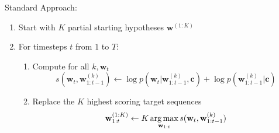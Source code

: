 \documentclass{beamer}
\let\tempone\itemize
\let\temptwo\enditemize
\renewenvironment{itemize}{\tempone\addtolength{\itemsep}{0.5\baselineskip}}{\temptwo}
\newcommand{\air}{\vspace{0.25cm}}
\newcommand{\wvec}{\mathbf{w}}
\newcommand{\cvec}{\mathbf{c}}
\def\argmax{\operatornamewithlimits{arg\,max}}
\def\argmax{\operatornamewithlimits{arg\,max}}
\begin{document}
\begin{frame}
  \centerline{Standard Approach: }
  \air 


  \begin{enumerate}
  \item Start with $K$ partial starting hypotheses $\wvec^{(1:K)}$
  \item For timesteps $t$ from  $1$ to $T$:
    \pause
   \begin{enumerate}
   \item Compute for all $k, \wvec_{t}$
     \[s(\wvec_t, \wvec_{1:t-1}^{(k)}) \gets \log p(\wvec_{t} | \wvec^{(k)}_{1:t-1}, \cvec) + \log p(\wvec^{(k)}_{1:t-1}| \cvec) \]
    \pause
   \item Replace the $K$ highest scoring target sequences
     \[\wvec_{1:t}^{(1:K)} \gets K\argmax_{\wvec_{1:t}} s(\wvec_t, \wvec_{1:t-1}^{(k)})\]  
   \end{enumerate}
  \end{enumerate}


  \pause
\end{frame}
\end{document}
